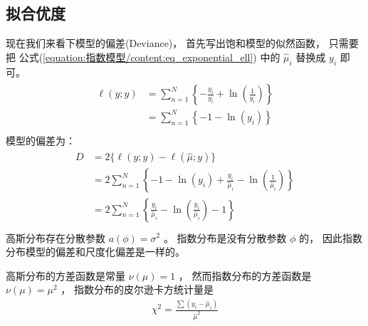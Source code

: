 \documentclass[letterpaper,10pt,english]{sphinxmanual}
\begin{document}
\subsection{拟合优度}
\label{\detokenize{_u6307_u6570_u6a21_u578b/content:id9}}
现在我们来看下模型的偏差(Deviance)，
首先写出饱和模型的似然函数，
只需要把 公式(\ref{equation:指数模型/content:eq_exponential_ell}) 中的 \(\hat{\mu}_i\)
替换成 \(y_i\) 即可。
\begin{align}\label{equation:指数模型/content:指数模型/content:16}\!\begin{aligned}
\ell(y;y) &= \sum_{n=1}^{N} \left \{
    - \frac{y_i}{y_i} + \ln \left ( \frac{1}{y_i} \right )
    \right \}\\
&= \sum_{n=1}^{N} \left \{ -1 - \ln(y_i)  \right \}\\
\end{aligned}\end{align}
模型的偏差为：
\begin{align}\label{equation:指数模型/content:指数模型/content:17}\!\begin{aligned}
D &= 2 \{ \ell(y;y) -  \ell(\hat{\mu};y)  \}\\
&= 2\sum_{n=1}^{N} \left \{
-1 - \ln(y_i) + \frac{y_i}{\hat{\mu}_i} - \ln \left ( \frac{1}{\hat{\mu}_i} \right )
\right \}\\
&= 2\sum_{n=1}^{N} \left \{ \frac{y_i}{\hat{\mu}_i} -\ln \left ( \frac{y_i}{\hat{\mu}_i} \right ) -1
\right \}\\
\end{aligned}\end{align}
高斯分布存在分散参数 \(a(\phi)=\sigma^2\) 。
指数分布是没有分散参数 \(\phi\) 的，
因此指数分布模型的偏差和尺度化偏差是一样的。

高斯分布的方差函数是常量 \(\nu(\mu)=1\) ，
然而指数分布的方差函数是 \(\nu(\mu) = \mu^2\) ，
指数分布的皮尔逊卡方统计量是
\begin{equation}\label{equation:指数模型/content:指数模型/content:18}
\begin{split}\chi^2 = \frac{\sum (y_i - \hat{\mu}_i)}{\hat{\mu}^2}\end{split}
\end{equation}
\end{document}
